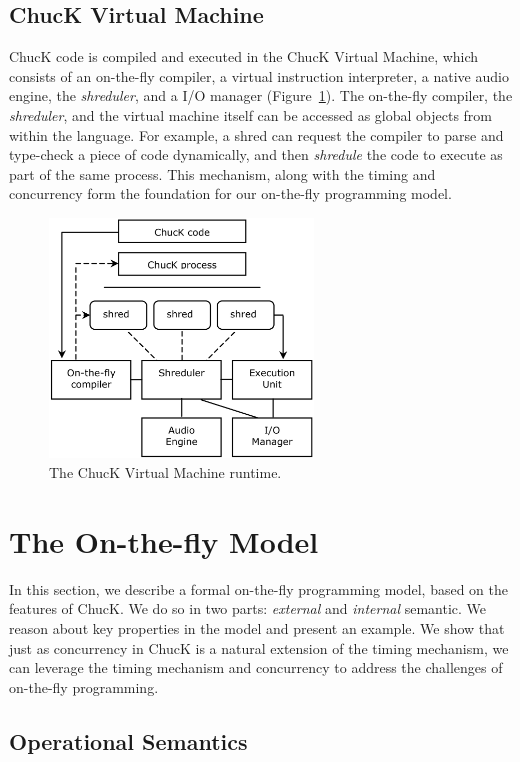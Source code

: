 \subsection{ChucK Virtual Machine}

ChucK code is compiled and executed in the ChucK Virtual Machine, which consists
of an on-the-fly compiler, a virtual instruction interpreter, a native audio
engine, the \textit{shreduler}, and a I/O manager (Figure~\ref{Wang:img-5}).  The on-the-fly
compiler, the \textit{shreduler}, and the virtual machine itself can be accessed
as global objects from within the language.  For example, a shred can request the
compiler to parse and type-check a piece of code dynamically, and then
\textit{shredule} the code to execute as part of the same process.  This
mechanism, along with the timing and concurrency form the foundation for our
on-the-fly programming model.


\begin{figure}[t]
\centering
\includegraphics[width=70mm]{fig5.png}
\caption{The ChucK Virtual Machine runtime.}
\label{Wang:img-5}
\end{figure}



\section{The On-the-fly Model}

In this section, we describe a formal on-the-fly programming model, based on the
features of ChucK.  We do so in two parts: \textit{external} and
\textit{internal} semantic.  We reason about key properties in the model and
present an example.  We show that just as concurrency in ChucK is a natural
extension of the timing mechanism, we can leverage the timing mechanism and
concurrency to address the challenges of on-the-fly programming.

\subsection{Operational Semantics}


